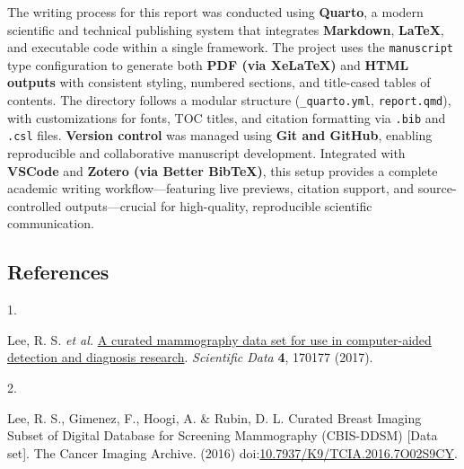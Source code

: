 \documentclass[
  12pt,
  letterpaper,
  DIV=11,
  numbers=noendperiod]{scrartcl}
\newlength{\cslhangindent}
\newlength{\csllabelwidth}
\newenvironment{CSLReferences}[2] %
 {\begin{list}{}{%
  \setlength{\itemindent}{0pt}
  \setlength{\leftmargin}{0pt}
  \setlength{\parsep}{0pt}
  \ifodd #1
   \setlength{\leftmargin}{\cslhangindent}
   \setlength{\itemindent}{-1\cslhangindent}
  \fi
  \setlength{\itemsep}{#2\baselineskip}}}
 {\end{list}}
\newcommand{\CSLLeftMargin}[1]{\parbox[t]{\csllabelwidth}{\strut#1\strut}}
\newcommand{\CSLRightInline}[1]{\parbox[t]{\linewidth - \csllabelwidth}{\strut#1\strut}}
\begin{document}
The writing process for this report was conducted using \textbf{Quarto},
a modern scientific and technical publishing system that integrates
\textbf{Markdown}, \textbf{LaTeX}, and executable code within a single
framework. The project uses the \texttt{manuscript} type configuration
to generate both \textbf{PDF (via XeLaTeX)} and \textbf{HTML outputs}
with consistent styling, numbered sections, and title-cased tables of
contents. The directory follows a modular structure
(\texttt{\_quarto.yml}, \texttt{report.qmd}), with customizations for
fonts, TOC titles, and citation formatting via \texttt{.bib} and
\texttt{.csl} files. \textbf{Version control} was managed using
\textbf{Git and GitHub}, enabling reproducible and collaborative
manuscript development. Integrated with \textbf{VSCode} and
\textbf{Zotero (via Better BibTeX)}, this setup provides a complete
academic writing workflow---featuring live previews, citation support,
and source-controlled outputs---crucial for high-quality, reproducible
scientific communication.

\subsection*{References}\label{references}

\label{refs}
\begin{CSLReferences}{0}{0}
\CSLLeftMargin{1. }%
\CSLRightInline{Lee, R. S. \emph{et al.}
\href{https://doi.org/10.1038/sdata.2017.177}{A curated mammography data
set for use in computer-aided detection and diagnosis research}.
\emph{Scientific Data} \textbf{4}, 170177 (2017).}

\CSLLeftMargin{2. }%
\CSLRightInline{Lee, R. S., Gimenez, F., Hoogi, A. \& Rubin, D. L.
Curated {Breast Imaging Subset} of {Digital Database} for {Screening
Mammography} ({CBIS-DDSM}) {[}{Data} set{]}. {The Cancer Imaging
Archive}. (2016)
doi:\href{https://doi.org/10.7937/K9/TCIA.2016.7O02S9CY}{10.7937/K9/TCIA.2016.7O02S9CY}.}

\end{CSLReferences}
\end{document}
